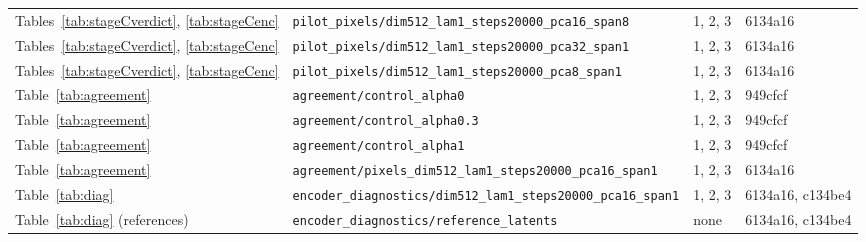 \begin{longtable}{p{3.6cm}p{6.2cm}p{1.6cm}p{1.6cm}}
Tables~\ref{tab:stageCverdict}, \ref{tab:stageCenc} & \texttt{pilot\_pixels/dim512\_lam1\_steps20000\_pca16\_span8} & 1, 2, 3 & 6134a16\\
Tables~\ref{tab:stageCverdict}, \ref{tab:stageCenc} & \texttt{pilot\_pixels/dim512\_lam1\_steps20000\_pca32\_span1} & 1, 2, 3 & 6134a16\\
Tables~\ref{tab:stageCverdict}, \ref{tab:stageCenc} & \texttt{pilot\_pixels/dim512\_lam1\_steps20000\_pca8\_span1} & 1, 2, 3 & 6134a16\\
Table~\ref{tab:agreement} & \texttt{agreement/control\_alpha0} & 1, 2, 3 & 949cfcf\\
Table~\ref{tab:agreement} & \texttt{agreement/control\_alpha0.3} & 1, 2, 3 & 949cfcf\\
Table~\ref{tab:agreement} & \texttt{agreement/control\_alpha1} & 1, 2, 3 & 949cfcf\\
Table~\ref{tab:agreement} & \texttt{agreement/pixels\_dim512\_lam1\_steps20000\_pca16\_span1} & 1, 2, 3 & 6134a16\\
Table~\ref{tab:diag} & \texttt{encoder\_diagnostics/dim512\_lam1\_steps20000\_pca16\_span1} & 1, 2, 3 & 6134a16, c134be4\\
Table~\ref{tab:diag} (references) & \texttt{encoder\_diagnostics/reference\_latents} & none & 6134a16, c134be4\\
\bottomrule\end{longtable}
